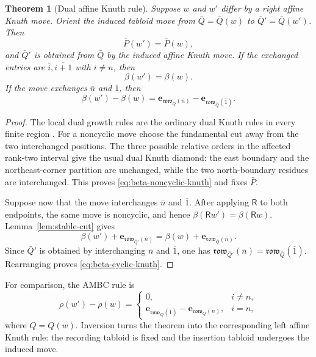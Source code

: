 \documentclass[11pt]{article}
\newtheorem{theorem}{Theorem}[section]
\theoremstyle{definition}
\theoremstyle{remark}
\newcommand{\ol}[1]{\overline{#1}}
\newcommand{\row}{\mathfrak{row}}
\newcommand{\e}{\mathbf e}
\newcommand{\Rop}{\mathsf R}
\begin{document}
\begin{theorem}[Dual affine Knuth rule]\label{thm:dual-knuth}
Suppose \(w\) and \(w'\) differ by a right affine Knuth move.  Orient the induced tabloid
move from \(\bar Q=\bar Q(w)\) to \(\bar Q'=\bar Q(w')\).  Then
\[
                         \bar P(w')=\bar P(w),
\]
and \(\bar Q'\) is obtained from \(\bar Q\) by the induced affine Knuth move.  If the
exchanged entries are \(\ol i,\ol{i+1}\) with \(i\ne n\), then
\begin{equation}\label{eq:beta-noncyclic-knuth}
                         \beta(w')=\beta(w).
\end{equation}
If the move exchanges \(\ol n\) and \(\ol1\), then
\begin{equation}\label{eq:beta-cyclic-knuth}
 \beta(w')-\beta(w)
 =\e_{\row_{\bar Q}(\ol n)}-\e_{\row_{\bar Q}(\ol1)}.
\end{equation}
\end{theorem}

\begin{proof}
The local dual growth rules are the ordinary dual Knuth rules in every finite region
\cite{Fom95}.  For a noncyclic move choose the fundamental cut away from the two
interchanged positions.  The three possible relative orders in the affected rank-two
interval give the usual dual Knuth diamond: the east boundary and the northeast-corner
partition are unchanged, while the two north-boundary residues are interchanged.  This
proves \eqref{eq:beta-noncyclic-knuth} and fixes \(\bar P\).

Suppose now that the move interchanges \(\ol n\) and \(\ol1\).  After applying \(\Rop\)
to both endpoints, the same move is noncyclic, and hence
\(\beta(\Rop w')=\beta(\Rop w)\).  Lemma~\ref{lem:stable-cut} gives
\[
 \beta(w')+\e_{\row_{\bar Q'}(\ol n)}
 =\beta(w)+\e_{\row_{\bar Q}(\ol n)}.
\]
Since \(\bar Q'\) is obtained by interchanging \(\ol n\) and \(\ol1\), one has
\(\row_{\bar Q'}(\ol n)=\row_{\bar Q}(\ol1)\).  Rearranging proves
\eqref{eq:beta-cyclic-knuth}.
\end{proof}

For comparison, the AMBC rule \cite[Theorem~3.11]{CLP18} is
\begin{equation}\label{eq:rho-knuth}
 \rho(w')-\rho(w)=
 \begin{cases}
  0,&i\ne n,\\[1.5mm]
  \e_{\row_Q(\ol1)}-\e_{\row_Q(\ol n)},&i=n,
 \end{cases}
\end{equation}
where \(Q=Q(w)\).  Inversion turns the theorem into the corresponding left affine
Knuth rule: the recording tabloid is fixed and the insertion tabloid undergoes the
induced move.
\end{document}
